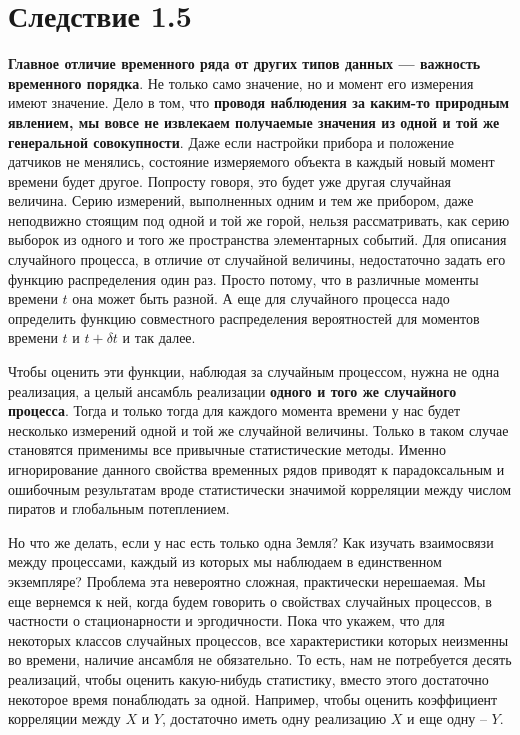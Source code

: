 \section*{Следствие 1.5}
\textbf{Главное отличие временного ряда от других типов данных — важность
временного порядка}. Не только само значение, но и момент его
измерения имеют значение. Дело в том, что \textbf{проводя наблюдения за
  каким-то природным явлением, мы вовсе не
  извлекаем получаемые значения из одной и той же генеральной
совокупности}. Даже если
настройки прибора и положение датчиков не менялись, состояние
измеряемого объекта в каждый новый момент времени будет другое.
Попросту говоря, это будет уже другая случайная величина. Серию
измерений, выполненных одним и тем же прибором, даже неподвижно
стоящим под одной и той же горой, нельзя рассматривать, как серию
выборок из одного и того же пространства элементарных событий. Для
описания случайного процесса, в отличие от случайной величины,
недостаточно задать его функцию
распределения один раз. Просто потому, что в различные моменты времени
$t$ она может быть разной. А еще для случайного процесса надо
определить функцию совместного распределения вероятностей для
моментов времени $t$ и $t+\delta t$ и так далее.

Чтобы оценить эти функции, наблюдая за случайным процессом, нужна не
одна реализация, а целый
ансамбль реализации \textbf{одного и того же случайного процесса}. Тогда
и только тогда для каждого момента времени у нас будет несколько
измерений одной и той же случайной величины. Только в таком случае
становятся применимы все привычные статистические методы. Именно
игнорирование данного свойства временных рядов приводят к
парадоксальным и ошибочным результатам вроде статистически значимой корреляции
между числом пиратов и глобальным потеплением.

Но что же делать, если у нас есть только одна Земля? Как изучать
взаимосвязи между процессами, каждый из которых мы наблюдаем в
единственном экземпляре? Проблема эта невероятно сложная,
практически нерешаемая. Мы еще вернемся к ней, когда будем говорить
о свойствах случайных процессов, в частности о стационарности и эргодичности.
Пока что укажем, что для некоторых классов случайных
процессов, все характеристики которых неизменны во времени, наличие
ансамбля не обязательно. То есть, нам не потребуется десять
реализаций, чтобы оценить какую-нибудь статистику, вместо этого
достаточно некоторое время понаблюдать за одной. Например, чтобы
оценить коэффициент корреляции между $X$ и $Y$, достаточно иметь одну
реализацию $X$ и еще одну – $Y$.


